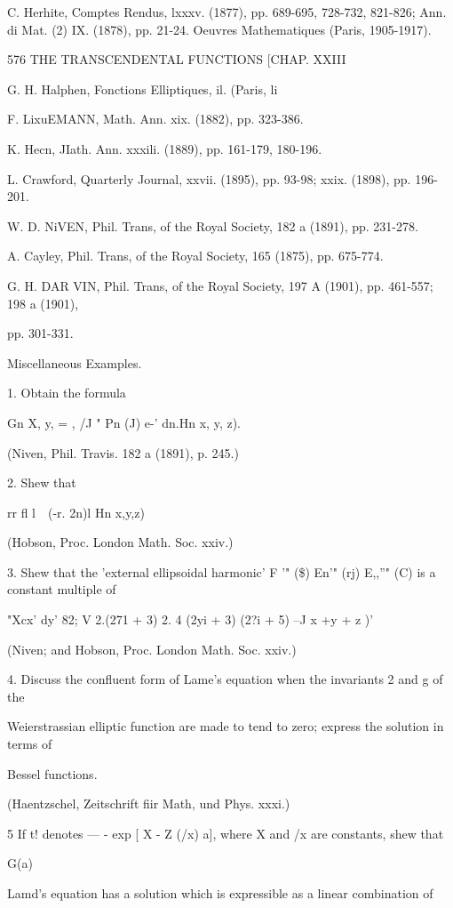 {{{{{{{{C. Herhite, Comptes Rendus, lxxxv. (1877), pp. 689-695, 728-732,
821-826; Ann. di Mat. (2) IX. (1878), pp. 21-24. Oeuvres
Mathematiques (Paris, 1905-1917).

576 THE TRANSCENDENTAL FUNCTIONS [CHAP. XXIII

G. H. Halphen, Fonctions Elliptiques, il. (Paris, li

F. LixuEMANN, Math. Ann. xix. (1882), pp. 323-386.

K. Hecn, JIath. Ann. xxxili. (1889), pp. 161-179, 180-196.

L. Crawford, Quarterly Journal, xxvii. (1895), pp. 93-98; xxix.
(1898), pp. 196-201.

W. D. NiVEN, Phil. Trans, of the Royal Society, 182 a (1891), pp.
231-278.

A. Cayley, Phil. Trans, of the Royal Society, 165 (1875), pp. 675-774.

G. H. DAR VIN, Phil. Trans, of the Royal Society, 197 A (1901), pp.
461-557; 198 a (1901),

pp. 301-331.

Miscellaneous Examples.

1. Obtain the formula

Gn X, y, = , /J " Pn (J) e-' dn.Hn x, y, z).

(Niven, Phil. Travis. 182 a (1891), p. 245.)

2. Shew that

rr fl l\ \ (-r. 2n)l Hn x,y,z)

(Hobson, Proc. London Math. Soc. xxiv.)

3. Shew that the 'external ellipsoidal harmonic' F '" (\$) En'" (rj)
E,,''" (C) is a constant multiple of

"Xcx' dy' 82; V 2.(271 + 3) 2. 4 (2yi + 3) (2?i + 5) --J x +y + z )'

(Niven; and Hobson, Proc. London Math. Soc. xxiv.)

4. Discuss the confluent form of Lame's equation when the invariants 2
and g of the

Weierstrassian elliptic function are made to tend to zero; express the
solution in terms of

Bessel functions.

(Haentzschel, Zeitschrift fiir Math, und Phys. xxxi.)

5 If t! denotes — - exp [ X - Z (/x) a], where X and /x are constants,
shew that

G(a)

Lamd's equation has a solution which is expressible as a linear
combination of

}}}}}}}}
